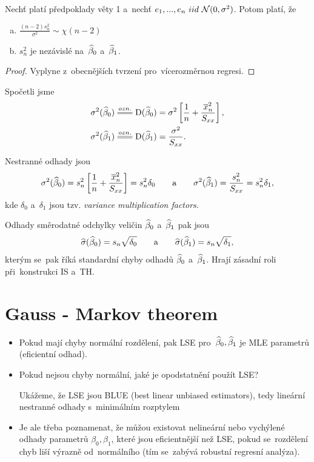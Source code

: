 \begin{corollary}\label{tvrzeni}
	Nechť platí předpoklady věty 1 a~nechť $e_1,..., e_n~iid~\mathcal{N}(0,\sigma^2)$. Potom platí, že
	\begin{enumerate}[a)]
		\item $\frac{(n-2)s_n^2}{\sigma^2} \sim \chi(n-2)$
		\item $s_n^2$ je nezávislé na~$\widehat{\beta}_0$ a~$\widehat{\beta}_1$.
	\end{enumerate}
\end{corollary}
\begin{proof}
	Vyplyne z~obecnějších tvrzení pro~vícerozměrnou regresi.
\end{proof}


\begin{remark}
	Spočetli jsme
	 \begin{align}
		\sigma^2(\wbeta_0) & \equal{ozn.}\D(\wbeta_0) = \sigma^2 \left[\frac{1}{n} + \frac{\lxn^2}{\Sxx} \right], \label{Vzorec: sigma(beta_0)} \\
		\sigma^2(\wbeta_1) & \equal{ozn.}\D(\wbeta_1) = \frac{\sigma^2}{\Sxx}. \label{Vzorec: sigma(beta_1)}
	 \end{align}
	
	Nestranné odhady jsou
	$$
		\sigma^2(\widehat{\beta}_0) = s_n^2  \left[\frac{1}{n} + \frac{\overline{x}_n^2}{S_{xx}} \right] = s_n^2 \delta_0 \qquad\text{a}\qquad
		\sigma^2(\widehat{\beta}_1) = \frac{s_n^2}{S_{xx}} = s_n^2 \delta_1,
	$$
	kde $\delta_0$ a~$\delta_1$ jsou tzv. \textit{variance multiplication factors}.
	
	Odhady směrodatné odchylky veličin $\widehat{\beta}_0$ a~$\widehat{\beta}_1$ pak jsou
	 $$
		\widehat{\sigma}(\widehat{\beta}_0) = s_n \sqrt{\delta_0} \qquad \text{a} \qquad \widehat{\sigma}(\widehat{\beta}_1) = s_n \sqrt{\delta_1},
	 $$
	kterým se~pak říká standardní chyby odhadů $\widehat{\beta}_0$ a~$\widehat{\beta}_1$. Hrají zásadní roli při~konstrukci IS a~TH.
\end{remark}

\section{Gauss - Markov theorem}

\begin{itemize}
	\item Pokud mají chyby normální rozdělení, pak LSE pro~$\widehat{\beta}_0, \widehat{\beta}_1$ je MLE parametrů (eficientní odhad).
	\item Pokud nejsou chyby normální, jaké je opodstatnění použít LSE?
	
	Ukážeme, že LSE jsou BLUE (best linear unbiased estimators), tedy lineární nestranné odhady s~minimálním rozptylem
	\item Je ale třeba poznamenat, že můžou existovat nelineární nebo vychýlené odhady parametrů $\beta_0, \beta_1$, které jsou eficientnější než LSE, pokud se~rozdělení chyb liší výrazně od~normálního (tím se~zabývá robustní regresní analýza).
\end{itemize}

